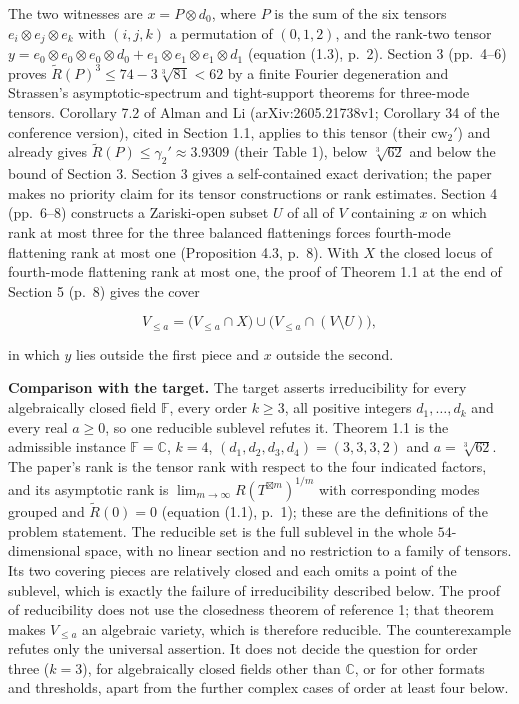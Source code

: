 \documentclass[11pt,a4paper]{article}
\begin{document}
The two witnesses are \(x=P\otimes d_0\), where \(P\) is the sum of the
six tensors \(e_i\otimes e_j\otimes e_k\) with \((i,j,k)\) a permutation
of \((0,1,2)\), and the rank-two tensor
\(y=e_0\otimes e_0\otimes e_0\otimes d_0+e_1\otimes e_1\otimes e_1\otimes d_1\)
(equation (1.3), p.~2). Section 3 (pp.~4--6) proves
\(\widetilde R(P)^3\leq74-3\sqrt[3]{81}<62\) by a finite Fourier
degeneration and Strassen's asymptotic-spectrum and tight-support
theorems for three-mode tensors. Corollary 7.2 of Alman and Li
(arXiv:2605.21738v1; Corollary 34 of the conference version), cited in
Section 1.1, applies to this tensor (their \(\mathrm{cw}_2'\)) and
already gives \(\widetilde R(P)\leq\gamma_2'\approx3.9309\) (their Table
1), below \(\sqrt[3]{62}\) and below the bound of Section 3. Section 3
gives a self-contained exact derivation; the paper makes no priority
claim for its tensor constructions or rank estimates. Section 4
(pp.~6--8) constructs a Zariski-open subset \(U\) of all of \(V\)
containing \(x\) on which rank at most three for the three balanced
flattenings forces fourth-mode flattening rank at most one (Proposition
4.3, p.~8). With \(X\) the closed locus of fourth-mode flattening rank
at most one, the proof of Theorem 1.1 at the end of Section 5 (p.~8)
gives the cover

\[V_{\leq a}=\bigl(V_{\leq a}\cap X\bigr)\cup\bigl(V_{\leq a}\cap(V\setminus U)\bigr),\]

in which \(y\) lies outside the first piece and \(x\) outside the
second.

\textbf{Comparison with the target.} The target asserts irreducibility
for every algebraically closed field \(\mathbb F\), every order
\(k\geq3\), all positive integers \(d_1,\ldots,d_k\) and every real
\(a\geq0\), so one reducible sublevel refutes it. Theorem 1.1 is the
admissible instance \(\mathbb F=\mathbb C\), \(k=4\),
\((d_1,d_2,d_3,d_4)=(3,3,3,2)\) and \(a=\sqrt[3]{62}\). The paper's rank
is the tensor rank with respect to the four indicated factors, and its
asymptotic rank is \(\lim_{m\to\infty}R(T^{\boxtimes m})^{1/m}\) with
corresponding modes grouped and \(\widetilde R(0)=0\) (equation (1.1),
p.~1); these are the definitions of the problem statement. The reducible
set is the full sublevel in the whole \(54\)-dimensional space, with no
linear section and no restriction to a family of tensors. Its two
covering pieces are relatively closed and each omits a point of the
sublevel, which is exactly the failure of irreducibility described
below. The proof of reducibility does not use the closedness theorem of
reference 1; that theorem makes \(V_{\leq a}\) an algebraic variety,
which is therefore reducible. The counterexample refutes only the
universal assertion. It does not decide the question for order three
(\(k=3\)), for algebraically closed fields other than \(\mathbb C\), or
for other formats and thresholds, apart from the further complex cases
of order at least four below.
\end{document}
